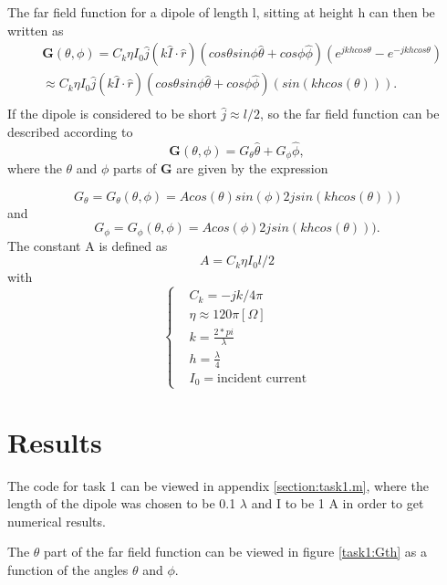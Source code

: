 The far field function  for a dipole of length l, sitting at height h can then be written as 
\begin{align}
&\mathbf{G}(\theta, \phi) = C_k\eta I_0 \hat{j}(k\hat{I} \cdot \hat{r})(cos\theta sin\phi \hat{\theta} + cos\phi \hat{\phi} )(e^{jkhcos\theta} -e^{-jkhcos\theta}) \\
& \approx C_k\eta I_0 \hat{j}(k\hat{I} \cdot \hat{r})(cos\theta sin\phi \hat{\theta} + cos\phi \hat{\phi} )(sin(khcos(\theta))). \\
\end{align}
If the dipole is considered to be short  $\hat{j} \approx l/2 $, so the far field function can be described according to  
\begin{equation}
\mathbf{G}(\theta, \phi) = G_{\theta}\hat{\theta} + G_{\phi}\hat{\phi},
\end{equation}
where the $\theta$ and $\phi$ parts of $\mathbf{G}$ are given by the expression

\begin{equation}
G_{\theta} = G_{\theta}(\theta, \phi) = Acos(\theta)sin(\phi)2jsin(khcos(\theta)))
\end{equation}
and 
\begin{equation}
G_{\phi} = G_{\phi}(\theta, \phi) = Acos(\phi)2jsin(khcos(\theta))).
\end{equation} 
The constant A is defined as 
\begin{equation}
A = C_k\eta I_0 l/2
\end{equation} 
with 
\begin{equation}
\begin{cases}
& C_k = -jk/4\pi \\
& \eta \approx 120 \pi [\Omega] \\
& k = \frac{2*pi}{\lambda} \\
& h = \frac{\lambda}{4}\\
& I_0 = \text{incident current}
 \end{cases}
\end{equation}\cite{kildal2000foundations}

\section{Results}
The code for task 1 can be viewed in appendix \ref{section:task1.m}, where the length of the dipole was chosen to be 0.1 $\lambda$ and I to be 1 A in order to get numerical results. 

The $\theta$ part of the far field function can be viewed in figure \ref{task1:Gth} as a function of the angles $\theta$ and $\phi$. 

